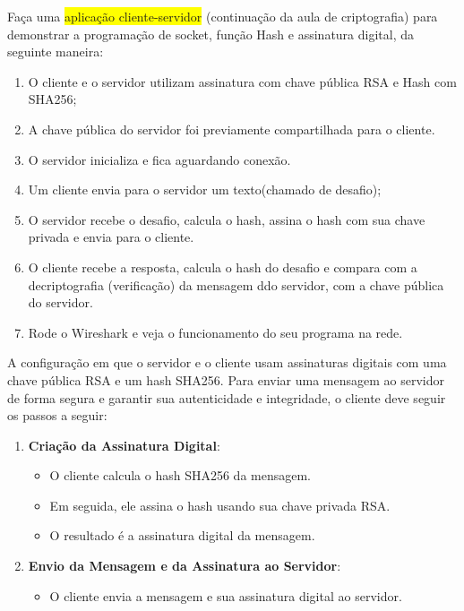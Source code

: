 \documentclass[a4paper,12pt]{article}
\begin{document}
Fa\c{c}a uma \colorbox{yellow}{aplica\c{c}\~ao cliente-servidor} (continua\c{c}\~ao da aula de criptografia) 
para demonstrar a programa\c{c}\~ao de socket, fun\c{c}\~ao Hash e assinatura digital, da 
seguinte maneira:

\begin{enumerate}
\item O cliente e o servidor utilizam assinatura com chave p\'ublica RSA e Hash com
SHA256;
\item A chave p\'ublica do servidor foi previamente compartilhada para o cliente.

\item O servidor inicializa e fica aguardando conex\~ao.
\item Um cliente envia para o servidor um texto(chamado de desafio);
\item O servidor recebe o desafio, calcula o hash, assina o hash com sua chave privada
e envia para o cliente.
\item O cliente recebe a resposta, calcula o hash do desafio e compara com a decriptografia
(verifica\c{c}\~ao) da mensagem ddo servidor, com a chave p\'ublica do servidor.
\item Rode o Wireshark e veja o funcionamento do seu programa na rede.
\end{enumerate}

A configuração em que o servidor e o cliente usam assinaturas digitais com uma chave 
pública RSA e um hash SHA256. Para enviar uma mensagem ao servidor de forma segura e garantir sua autenticidade e 
integridade, o cliente deve seguir os passos a seguir:

\begin{enumerate}
\item \textbf{Criação da Assinatura Digital}:
\begin{itemize}
    \item O cliente calcula o hash SHA256 da mensagem.
    \item Em seguida, ele assina o hash usando sua chave privada RSA.
    \item O resultado é a assinatura digital da mensagem.
\end{itemize}

\item \textbf{Envio da Mensagem e da Assinatura ao Servidor}:
\begin{itemize}
    \item O cliente envia a mensagem e sua assinatura digital ao servidor.
\end{itemize}
\end{enumerate}
\end{document}
